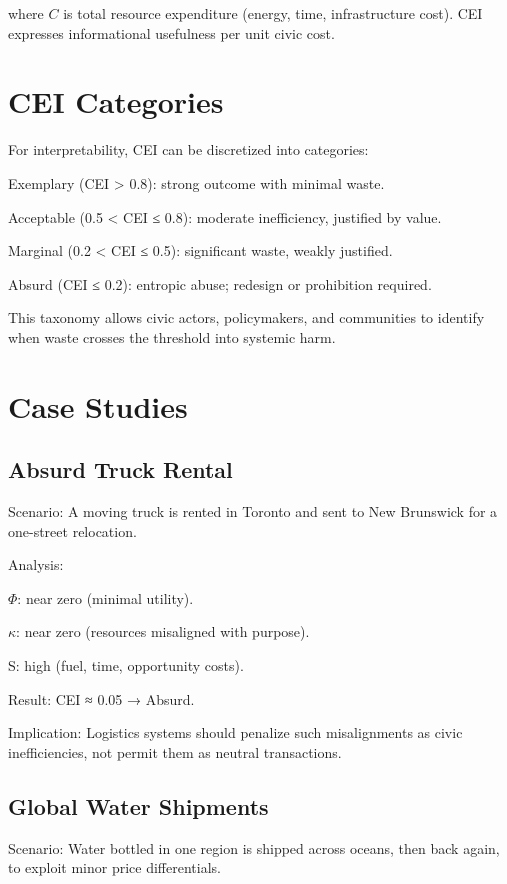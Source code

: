 \documentclass{book}
\begin{document}
where \( C \) is total resource expenditure (energy, time, infrastructure cost). CEI expresses informational usefulness per unit civic cost.

\section{CEI Categories}

For interpretability, CEI can be discretized into categories:

Exemplary (CEI > 0.8): strong outcome with minimal waste.

Acceptable (0.5 < CEI ≤ 0.8): moderate inefficiency, justified by value.

Marginal (0.2 < CEI ≤ 0.5): significant waste, weakly justified.

Absurd (CEI ≤ 0.2): entropic abuse; redesign or prohibition required.

This taxonomy allows civic actors, policymakers, and communities to identify when waste crosses the threshold into systemic harm.

\section{Case Studies}

\subsection{Absurd Truck Rental}

Scenario: A moving truck is rented in Toronto and sent to New Brunswick for a one-street relocation.

Analysis:

\(\Phi\): near zero (minimal utility).

\(\kappa\): near zero (resources misaligned with purpose).

S: high (fuel, time, opportunity costs).

Result: CEI ≈ 0.05 → Absurd.

Implication: Logistics systems should penalize such misalignments as civic inefficiencies, not permit them as neutral transactions.

\subsection{Global Water Shipments}

Scenario: Water bottled in one region is shipped across oceans, then back again, to exploit minor price differentials.
\end{document}
